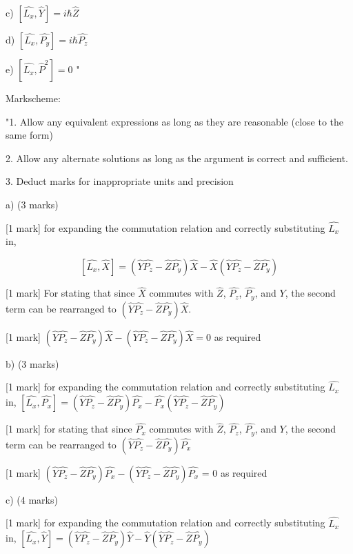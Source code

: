 c) \( \left[ \hat{L_{x}}, \hat{Y} \right] = i \hbar \hat{Z} \)

d) \( \left[ \hat{L_{x}}, \hat{P_{y}} \right] = i \hbar \hat{P_{z}} \)

e) \( \left[ \hat{L_{x}}, \hat{P}^{2} \right] = 0 \) "

Markscheme:

"1. Allow any equivalent expressions as long as they are reasonable (close to the same form)

2. Allow any alternate solutions as long as the argument is correct and sufficient. 

3. Deduct marks for inappropriate units and precision

a) (3 marks)

[1 mark] for expanding the commutation relation and correctly substituting \( \hat{L_{x}} \) in, 

\[ 
\left[ \hat{L_{x}}, \hat{X} \right] = (\hat{Y}\hat{P_{z}} - \hat{Z}\hat{P_{y}})\hat{X} - \hat{X}(\hat{Y}\hat{P_{z}} - \hat{Z}\hat{P_{y}})
\]

[1 mark] For stating that since \( \hat{X} \) commutes with \( \hat{Z} \), \( \hat{P_{z}} \), \( \hat{P_{y}} \), and \( Y \), the second term can be rearranged to \( (\hat{Y}\hat{P_{z}} - \hat{Z}\hat{P_{y}})\hat{X} \).

[1 mark] \( (\hat{Y}\hat{P_{z}} - \hat{Z}\hat{P_{y}})\hat{X} - (\hat{Y}\hat{P_{z}} - \hat{Z}\hat{P_{y}})\hat{X} = 0 \) as required

b) (3 marks)

[1 mark] for expanding the commutation relation and correctly substituting \( \hat{L_{x}} \) in, \([\hat{L_{x}}, \hat{P_{x}}] = (\hat{Y}\hat{P_{z}} - \hat{Z}\hat{P_{y}})\hat{P_{x}} - \hat{P_{x}}(\hat{Y}\hat{P_{z}} - \hat{Z}\hat{P_{y}})\)

[1 mark] for stating that since \( \hat{P_{x}} \) commutes with \( \hat{Z} \), \( \hat{P_{z}} \), \( \hat{P_{y}} \), and \( Y \), the second term can be rearranged to \( (\hat{Y}\hat{P_{z}} - \hat{Z}\hat{P_{y}})\hat{P_{x}} \)

[1 mark] \((\hat{Y}\hat{P_{z}} - \hat{Z}\hat{P_{y}})\hat{P_{x}}  - (\hat{Y}\hat{P_{z}} - \hat{Z}\hat{P_{y}})\hat{P_{x}}\)  = 0 as required

c)  (4 marks)

[1 mark] for expanding the commutation relation and correctly substituting \( \hat{L_{x}} \) in, \([\hat{L_{x}}, \hat{Y}] = (\hat{Y}\hat{P_{z}} - \hat{Z}\hat{P_{y}})\hat{Y} - \hat{Y}(\hat{Y}\hat{P_{z}} - \hat{Z}\hat{P_{y}})\)

